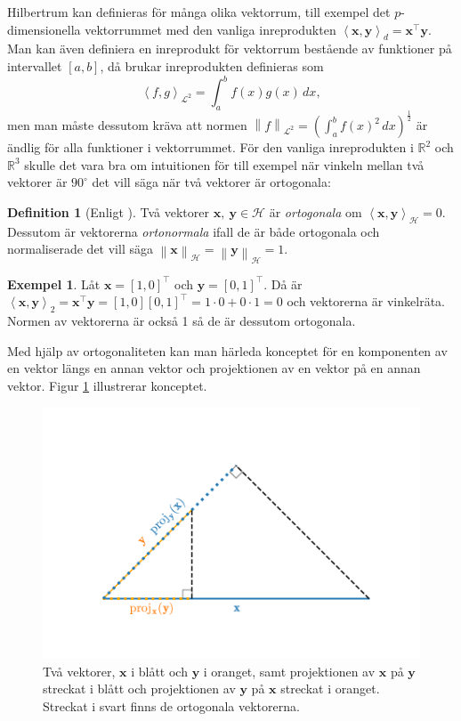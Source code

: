 \documentclass[a4paper, 12pt]{report}
\theoremstyle{definition}
\newtheorem{defi}{Definition}[section]
\newtheorem{ex}{Exempel}[section]
\theoremstyle{remark}
\newcommand{\bfx}{\mathbf{x}}
\newcommand{\bfy}{\mathbf{y}}
\newcommand{\llangle}{\left\langle}
\newcommand{\rrangle}{\right\rangle}
\newcommand{\inner}[2]{\llangle #1, #2 \rrangle}
\newcommand{\hil}{\mathcal{H}}
\begin{document}
Hilbertrum kan definieras för många olika vektorrum, till exempel det $p$-dimensionella vektorrummet med den vanliga inreprodukten $\left\langle \mathbf{x}, \mathbf{y} \right\rangle_d = \mathbf{x}^\intercal\mathbf{y}$.
Man kan även definiera en inreprodukt för vektorrum bestående av funktioner på intervallet $\left[a,b\right]$, då brukar inreprodukten definieras som
\begin{equation*}
\left\langle f, g\right\rangle_{\mathcal{L}^2}=\int_{a}^{b}f\left(x\right)g\left(x\right) \, dx ,
\end{equation*}
men man måste dessutom kräva att normen $\left\|f\right\|_{\mathcal{L}^2} = \left(\int_{a}^{b}f\left(x\right)^2\,dx\right)^{\frac{1}{2}}$ är ändlig för alla funktioner i vektorrummet. För den vanliga inreprodukten i $\mathbb{R}^2$ och $\mathbb{R}^3$ skulle det vara bra om intuitionen för till exempel när vinkeln mellan två vektorer är $90^\circ$ det vill säga när två vektorer är ortogonala:

\begin{defi}[Enligt \cite{Lang}]
	Två vektorer $\bfx, ~\bfy\in\hil$ är \emph{ortogonala} om $\inner{\bfx}{\bfy}_\hil=0$. Dessutom är vektorerna \emph{ortonormala} ifall de är både ortogonala och normaliserade det vill säga $\left\|\bfx\right\|_\hil=\left\|\bfy\right\|_\hil=1$.
\end{defi}
\begin{ex}%
	Låt $\bfx=\left[1, 0\right]^\intercal$ och $\bfy=\left[0, 1\right]^\intercal$. Då är $\inner{\bfx}{\bfy}_2=\bfx^\intercal\bfy=\left[1, 0\right]\left[0, 1\right]^\intercal = 1\cdot0 + 0\cdot1=0$ och vektorerna är vinkelräta. Normen av vektorerna är också 1 så de är dessutom ortogonala.
\end{ex}

Med hjälp av ortogonaliteten kan man härleda konceptet för en komponenten av en vektor längs en annan vektor och projektionen av en vektor på en annan vektor.
Figur \ref{fig:proj} illustrerar konceptet.

\begin{figure}[h]
	\centering
	\includegraphics[width=0.8\linewidth, trim={2.1cm 17mm 2cm 20mm}, clip]{KandFigur4.pdf}
	\caption{\label{fig:proj}Två vektorer, $\bfx$ i blått och $\bfy$ i oranget, samt projektionen av $\bfx$ på $\bfy$ streckat i blått och projektionen av $\bfy$ på $\bfx$ streckat i oranget. Streckat i svart finns de ortogonala vektorerna.}
\end{figure}
\end{document}
